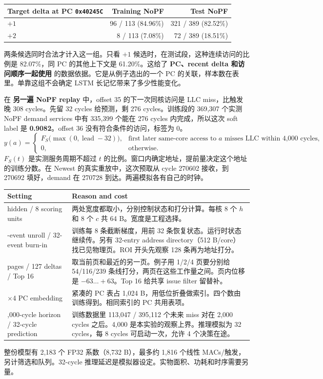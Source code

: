 \documentclass[10pt,letterpaper]{article}
\newcommand{\subhead}[1]{\vspace{5pt}{\large\bfseries #1}\par}
\newcommand{\smallnote}[1]{{\small\color{muted}#1}\par}
\begin{document}
\subhead{同一 PC、同一页上的方向信号}
{\small
\begin{tabular}{@{}lrr@{}}
\toprule
Target delta at PC \texttt{0x40245C} & Training NoPF & Test NoPF\\
\midrule
$+1$ & 96 / 113 (84.96\%) & 321 / 389 (82.52\%)\\
$+2$ & 8 / 113 (7.08\%) & 72 / 389 (18.51\%)\\
\bottomrule
\end{tabular}\par}
两条候选同时合法才计入这一组。只看 $+1$ 候选时，在测试段，这种连续访问的比例是 82.07\%，同 PC 的其他上下文是 61.20\%。这给了 \textbf{PC、recent delta 和访问顺序一起使用} 的数据依据。它是从例子选出的一个 PC 的关联，样本数在表里。单靠这组不会确定 LSTM 长记忆带来了多少性能变化。

\subhead{同一条线的 NoPF label}
在 \textbf{另一遍 NoPF replay} 中，offset 35 的下一次同核访问是 LLC miss，比触发晚 308 cycles。先留 32 cycles 给预测，剩 276 cycles。训练段的 369,307 个实测 NoPF demand services 中有 335,399 个能在 276 cycles 内完成，所以这次 soft label 是 \textbf{0.9082}。offset 36 没有符合条件的访问，标签为 0。
\[
y(a)=
\begin{cases}
F_S\bigl(\max(0,\operatorname{lead}-32)\bigr),
  & \text{first later same-core access to }a\text{ misses LLC within 4,000 cycles},\\
0,&\text{otherwise}.
\end{cases}
\]
$F_S(t)$ 是实测服务周期不超过 $t$ 的比例。窗口内确定地址，提前量决定这个地址的训练分数。在 Newest 的真实重放中，这次预取从 cycle 270602 接收，到 270692 填好，demand 在 270728 到达。两遍模拟各有自己的时钟。

\subhead{这些数字各控制什么？}
{\small
\begin{tabular}{@{}>{\raggedright\arraybackslash}p{3.84cm}>{\raggedright\arraybackslash}p{13.44cm}@{}}
\toprule
\textbf{Setting} & \textbf{Reason and cost}\\
\midrule
8 hidden / 8 scoring units & 两处宽度都取小，分别控制状态和打分计算。每核 8 个 $h$ 和 8 个 $c$ 共 64 B。宽度是工程选择。\\[2pt]
8-event unroll / 32-event burn-in & 训练每 8 条截断梯度，用前 32 条恢复状态。运行时状态继续传。另有 32-entry address directory（512 B/core）找已见物理页。ROI 开头先观察 128 条再为地址打分。\\[2pt]
2 pages / 127 deltas / Top 16 & 取当前页和最近的另一页。例子用 1/2/4 页要分别给 54/116/239 条线打分，两页在这些工作量之间。页内位移是 $-63\ldots+63$。Top 16 给共享 issue filter 留替补。\\[2pt]
64$\times$4 PC embedding & 紧凑的 PC 表占 1,024 B，用低位折叠做索引。四个数由训练得到。相同索引的 PC 共用表项。\\[2pt]
4,000-cycle horizon / 32-cycle prediction & 训练数据里 113,047 / 395,112 个未来 miss 对在 2,000 cycles 之后。4,000 是本实验的观察上界。推理模拟为 32 cycles，每 8 cycles 可启动一次，允许 4 个决策在途。\\
\bottomrule
\end{tabular}\par}
\smallnote{整份模型有 2,183 个 FP32 系数（8,732 B），最多约 1,816 个线性 MACs/触发，另计筛选和队列。32-cycle 推理延迟是模拟器设定。实物面积、功耗和时序需要另量。}
\end{document}
